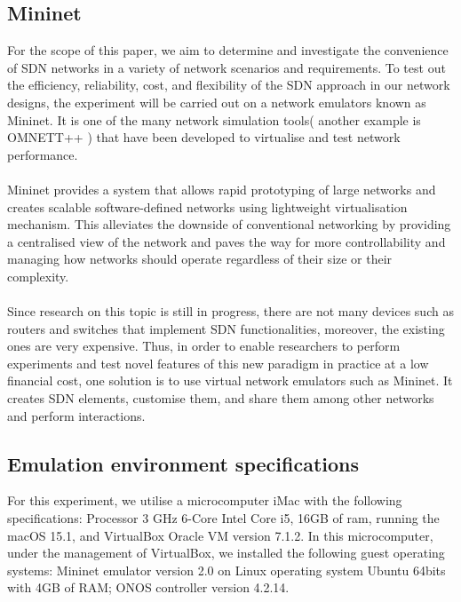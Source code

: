 \documentclass{article}
\begin{document}
\subsection{Mininet}
For the scope of this paper, we aim to determine and investigate the convenience of SDN networks in a variety of network scenarios and requirements. To test out the efficiency, reliability, cost, and flexibility of the SDN approach in our network designs, the experiment will be carried out on a network emulators known as Mininet. It is one of the many network simulation tools( another example is OMNETT++ ) that have been developed to virtualise and test network performance\cite{10220519, Haji_Zeebaree_Saeed_Ameen_Shukur_Omar_Sadeeq_Ageed_Ibrahim_Yasin_2021}. \\\\ Mininet\cite{6860404} provides a system that allows rapid prototyping of large networks and creates scalable software-defined networks using lightweight virtualisation mechanism. This alleviates the downside of conventional networking by providing a centralised view of the network and paves the way for more controllability and managing how networks should operate regardless of their size or their complexity. \\\\
Since research on this topic is still in progress, there are not many devices such as routers and switches that implement SDN functionalities, moreover, the existing ones are very expensive. Thus, in order to enable researchers to perform experiments and test novel features of this new paradigm in practice at a low financial cost, one solution is to use virtual network emulators such as Mininet. It creates SDN elements, customise them, and share them among other networks and perform interactions\cite{6860404}.
\newpage
\subsection{Emulation environment specifications}
For this experiment, we utilise a microcomputer iMac with the following specifications: Processor 3 GHz 6-Core Intel Core i5, 16GB of ram, running the macOS 15.1, and VirtualBox Oracle VM version 7.1.2.
In this microcomputer, under the management of VirtualBox, we installed the following guest operating systems: Mininet emulator version 2.0 on Linux operating system Ubuntu 64bits with 4GB of RAM; ONOS controller version 4.2.14.
\end{document}
